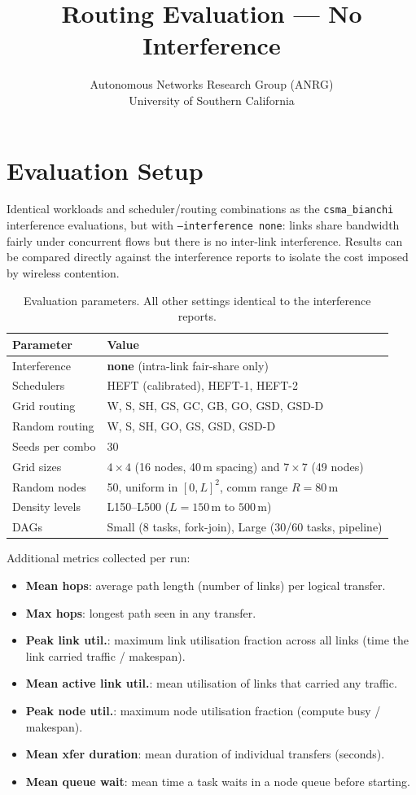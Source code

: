 \documentclass[11pt]{article}
\title{Routing Evaluation --- No Interference}
\author{Autonomous Networks Research Group (ANRG)\\University of Southern California}
\date{}
\begin{document}
\maketitle
\tableofcontents
\newpage

\section{Evaluation Setup}

Identical workloads and scheduler/routing combinations as the \texttt{csma\_bianchi}
interference evaluations, but with \texttt{--interference none}: links share
bandwidth fairly under concurrent flows but there is no inter-link interference.
Results can be compared directly against the interference reports to isolate
the cost imposed by wireless contention.

\begin{table}[H]
\centering
\begin{tabular}{ll}
\toprule
\textbf{Parameter} & \textbf{Value} \\
\midrule
Interference & \textbf{none} (intra-link fair-share only) \\
Schedulers & HEFT (calibrated), HEFT-1, HEFT-2 \\
Grid routing & W, S, SH, GS, GC, GB, GO, GSD, GSD-D \\
Random routing & W, S, SH, GO, GS, GSD, GSD-D \\
Seeds per combo & 30 \\
Grid sizes & $4\times4$ (16 nodes, 40\,m spacing) and $7\times7$ (49 nodes) \\
Random nodes & 50, uniform in $[0,L]^2$, comm range $R=80$\,m \\
Density levels & L150--L500 ($L=150$\,m to $500$\,m) \\
DAGs & Small (8 tasks, fork-join), Large (30/60 tasks, pipeline) \\
\bottomrule
\end{tabular}
\caption{Evaluation parameters. All other settings identical to the interference reports.}
\end{table}

Additional metrics collected per run:
\begin{itemize}\setlength{\itemsep}{1pt}
  \item \textbf{Mean hops}: average path length (number of links) per logical transfer.
  \item \textbf{Max hops}: longest path seen in any transfer.
  \item \textbf{Peak link util.}: maximum link utilisation fraction across all links
        (time the link carried traffic / makespan).
  \item \textbf{Mean active link util.}: mean utilisation of links that carried any traffic.
  \item \textbf{Peak node util.}: maximum node utilisation fraction (compute busy / makespan).
  \item \textbf{Mean xfer duration}: mean duration of individual transfers (seconds).
  \item \textbf{Mean queue wait}: mean time a task waits in a node queue before starting.
\end{itemize}
\end{document}
